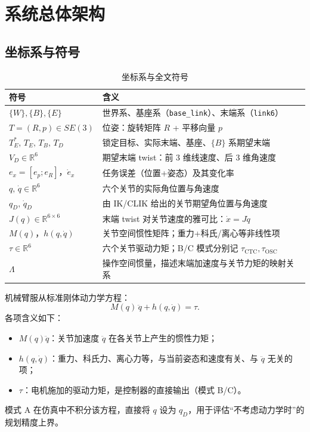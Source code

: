 \documentclass[UTF8, a4paper, 12pt]{ctexart}
\begin{document}
\section{系统总体架构}

\subsection{坐标系与符号}

\begin{table}[H]
  \centering
  \caption{坐标系与全文符号}
  \label{tab:notation}
  \renewcommand{\arraystretch}{1.15}
  \begin{tabular}{@{} l l @{}}
    \toprule
    符号 & 含义 \\
    \midrule
    $\{W\},\{B\},\{E\}$ & 世界系、基座系（\texttt{base\_link}）、末端系（\texttt{link6}） \\
    $T=(R,p)\in SE(3)$ & 位姿：旋转矩阵 $R$ + 平移向量 $p$ \\
    $T_E^*,\, T_E,\, T_B,\, T_D$ & 锁定目标、实际末端、基座、$\{B\}$ 系期望末端 \\
    $V_D \in \mathbb{R}^6$ & 期望末端 twist：前 3 维线速度、后 3 维角速度 \\
    $e_x=[e_p;e_R]$，$\dot{e}_x$ & 任务误差（位置+姿态）及其变化率 \\
    $q,\,\dot{q}\in\mathbb{R}^6$ & 六个关节的实际角位置与角速度 \\
    $q_D,\,\dot{q}_D$ & 由 IK/CLIK 给出的关节期望角位置与角速度 \\
    $J(q)\in\mathbb{R}^{6\times 6}$ & 末端 twist 对关节速度的雅可比：$\dot{x}=J\dot{q}$ \\
    $M(q)$，$h(q,\dot{q})$ & 关节空间惯性矩阵；重力+科氏/离心等非线性项 \\
    $\tau\in\mathbb{R}^6$ & 六个关节驱动力矩；B/C 模式分别记 $\tau_{\mathrm{CTC}},\tau_{\mathrm{OSC}}$ \\
    $\Lambda$ & 操作空间惯量，描述末端加速度与关节力矩的映射关系 \\
    \bottomrule
  \end{tabular}
\end{table}

机械臂服从标准刚体动力学方程：
\begin{equation}
    M(q)\,\ddot{q} + h(q,\dot{q}) = \tau.
    \label{eq:dynamics}
\end{equation}
各项含义如下：
\begin{itemize}[leftmargin=2em]
    \item $M(q)\ddot{q}$：关节加速度 $\ddot{q}$ 在各关节上产生的惯性力矩；
    \item $h(q,\dot{q})$：重力、科氏力、离心力等，与当前姿态和速度有关、与 $\ddot{q}$ 无关的项；
    \item $\tau$：电机施加的驱动力矩，是控制器的直接输出（模式 B/C）。
\end{itemize}
模式 A 在仿真中不积分该方程，直接将 $q$ 设为 $q_D$，用于评估“不考虑动力学时”的规划精度上界。
\end{document}
